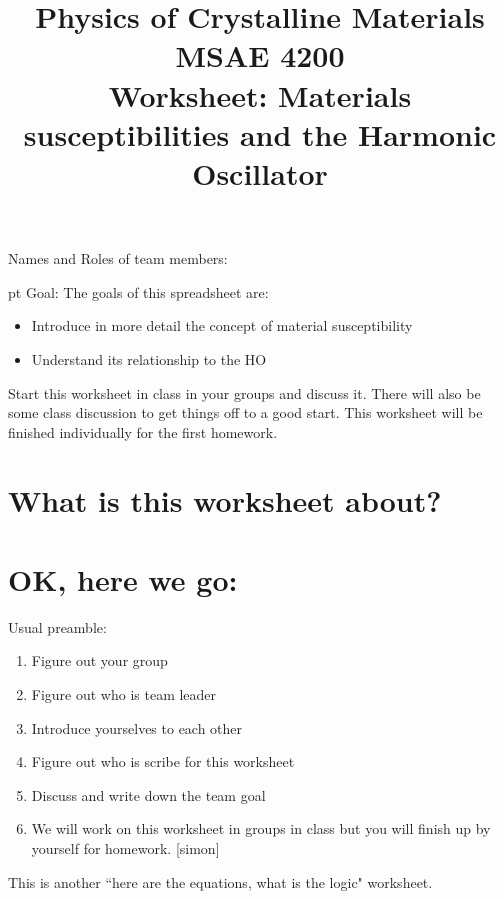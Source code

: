\documentclass[]{revtex4}
\begin{document}
  
  \title{Physics of Crystalline Materials\\
    MSAE 4200\\
    Worksheet: Materials susceptibilities and the Harmonic Oscillator}
  
  \maketitle
  
  \vskip 24pt
  {Names and Roles of team members:}
  
   pt
  Goal: The goals of this spreadsheet are:
  \begin{itemize}
    \item Introduce in more detail the concept of material susceptibility
    \item Understand its relationship to the HO
  \end{itemize}
  
  \cork{}
  \vskip 12pt
  
  
  
  Start this worksheet in class in your groups and discuss it.  There will also be some class discussion to get things off to a good start.  This worksheet will be finished individually for the first homework.
  
  \section*{What is this worksheet about?}
  \section*{OK, here we go:}
  Usual preamble:
  \begin{enumerate}
    \item Figure out your group
    \item Figure out who is team leader
    \item Introduce yourselves to each other
    \item Figure out who is scribe for this worksheet
    \item Discuss and write down the team goal
    \item We will work on this worksheet in groups in class but you will finish up by yourself for homework.  [simon]
  \end{enumerate}
  
  This is another ``here are the equations, what is the logic" worksheet.
  
\end{document}
